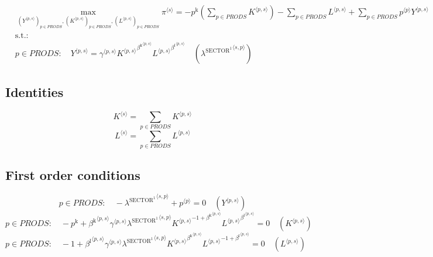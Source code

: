 \begin{align}
&\max_{\left({Y}^{\langle p,s\rangle}\right)_{p\in {P\!R\!O\!D\!S}}, \left({K}^{\langle p,s\rangle}\right)_{p\in {P\!R\!O\!D\!S}}, \left({L}^{\langle p,s\rangle}\right)_{p\in {P\!R\!O\!D\!S}}
} {\pi}^{\langle s\rangle} = -{p^{\mathrm{k}}} \left(\sum_{p\in {P\!R\!O\!D\!S}} {K}^{\langle p,s\rangle}\right) - \sum_{p\in {P\!R\!O\!D\!S}} {L}^{\langle p,s\rangle} + \sum_{p\in {P\!R\!O\!D\!S}} {{p}^{\langle p\rangle}} {{Y}^{\langle p,s\rangle}}\\
&\mathrm{s.t.:}\nonumber\\
& p\in {P\!R\!O\!D\!S}\colon\quad {Y}^{\langle p,s\rangle} = {{\gamma}^{\langle p,s\rangle}} {{{K}^{\langle p,s\rangle}}^{{\beta^{\mathrm{k}}}^{\langle p,s\rangle}}} {{{L}^{\langle p,s\rangle}}^{{\beta^{\mathrm{l}}}^{\langle p,s\rangle}}} \quad \left({\lambda^{\mathrm{SECTOR}^{\mathrm{1}}}}^{\langle s,p\rangle}\right)
\end{align}


\subsection{Identities}

\begin{equation}
{K}^{\langle s\rangle} = \sum_{p\in {P\!R\!O\!D\!S}} {K}^{\langle p,s\rangle}
\end{equation}
\begin{equation}
{L}^{\langle s\rangle} = \sum_{p\in {P\!R\!O\!D\!S}} {L}^{\langle p,s\rangle}
\end{equation}


\subsection{First order conditions}

\begin{equation}
p\in {P\!R\!O\!D\!S}\colon\quad -{\lambda^{\mathrm{SECTOR}^{\mathrm{1}}}}^{\langle s,p\rangle} + {p}^{\langle p\rangle} = 0
 \quad \left({Y}^{\langle p,s\rangle}\right)
\end{equation}
\begin{equation}
p\in {P\!R\!O\!D\!S}\colon\quad -p^{\mathrm{k}} + {{\beta^{\mathrm{k}}}^{\langle p,s\rangle}} {{\gamma}^{\langle p,s\rangle}} {{\lambda^{\mathrm{SECTOR}^{\mathrm{1}}}}^{\langle s,p\rangle}} {{{K}^{\langle p,s\rangle}}^{-1 + {\beta^{\mathrm{k}}}^{\langle p,s\rangle}}} {{{L}^{\langle p,s\rangle}}^{{\beta^{\mathrm{l}}}^{\langle p,s\rangle}}} = 0
 \quad \left({K}^{\langle p,s\rangle}\right)
\end{equation}
\begin{equation}
p\in {P\!R\!O\!D\!S}\colon\quad -1 + {{\beta^{\mathrm{l}}}^{\langle p,s\rangle}} {{\gamma}^{\langle p,s\rangle}} {{\lambda^{\mathrm{SECTOR}^{\mathrm{1}}}}^{\langle s,p\rangle}} {{{K}^{\langle p,s\rangle}}^{{\beta^{\mathrm{k}}}^{\langle p,s\rangle}}} {{{L}^{\langle p,s\rangle}}^{-1 + {\beta^{\mathrm{l}}}^{\langle p,s\rangle}}} = 0
 \quad \left({L}^{\langle p,s\rangle}\right)
\end{equation}




